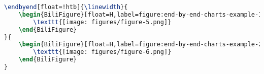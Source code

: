 \begin{lstlisting}[language=LaTeX, caption=End-by-End Charts Example, label=listing:end-by-end-charts-example]
\endbyend[float=!htb]{\linewidth}{
    \begin{BiliFigure}[float=H,label=figure:end-by-end-charts-example-1]{An example of shear wave velocity measurement}{剪切波速度测量示例}
        \texttt{[image: figures/figure-5.png]}
    \end{BiliFigure}
}{
    \begin{BiliFigure}[float=H,label=figure:end-by-end-charts-example-2]{An example of shear wave velocity measurement}{剪切波速度测量示例}
        \texttt{[image: figures/figure-6.png]}
    \end{BiliFigure}
}
\end{lstlisting}

